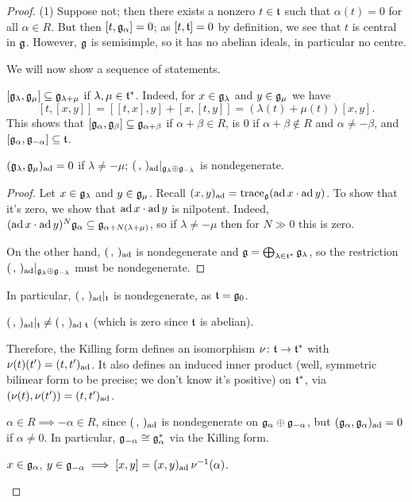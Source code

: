 \begin{proof}\leavevmode
(1) Suppose not; then there exists a nonzero $t \in \mathfrak{t}$ such that
$\alpha(t) = 0$ for all $\alpha \in R$. But then $[t, \mathfrak{g}_\alpha] = 0$; as
$[t, \mathfrak{t}] = 0$ by definition, we see that $t$ is central in $\mathfrak{g}$. However, $\mathfrak{g}$
is semisimple, so it has no abelian ideals, in particular no centre.

We will now show a sequence of statements.
\begin{alist}
  \item $[\mathfrak{g}_\lambda, \mathfrak{g}_\mu] \subseteq \mathfrak{g}_{\lambda+\mu}$ if
    $\lambda, \mu \in \mathfrak{t}^*$. Indeed, for $x \in \mathfrak{g}_\lambda$ and
    $y \in \mathfrak{g}_\mu$ we have
    \[
      [t, [x, y]] = [[t, x], y] + [x, [t, y]] = (\lambda(t) + \mu(t))[x, y].
    \]
    This shows that $[\mathfrak{g}_\alpha, \mathfrak{g}_\beta] \subseteq \mathfrak{g}_{\alpha+\beta}$ if
    $\alpha + \beta \in R$, is $0$ if $\alpha + \beta \notin R$ and
    $\alpha \neq -\beta$, and $[\mathfrak{g}_\alpha, \mathfrak{g}_{-\alpha}] \subseteq \mathfrak{t}$.
  \item $(\mathfrak{g}_\lambda, \mathfrak{g}_\mu)_{\operatorname{ad}} = 0$ if $\lambda \neq -\mu$;
    $(\,,\,)_{\operatorname{ad}}|_{\mathfrak{g}_\lambda \oplus \mathfrak{g}_{-\lambda}}$ is nondegenerate.

    \begin{proof}
    Let $x \in \mathfrak{g}_\lambda$ and $y \in \mathfrak{g}_\mu$. Recall
    $(x, y)_{\operatorname{ad}} = \operatorname{trace}_{\mathfrak{g}}(\operatorname{ad} x \cdot \operatorname{ad} y)$. To show that it's zero, we
    show that $\operatorname{ad} x \cdot \operatorname{ad} y$ is nilpotent. Indeed,
    $(\operatorname{ad} x \cdot \operatorname{ad} y)^N\mathfrak{g}_\alpha \subseteq \mathfrak{g}_{\alpha + N(\lambda+\mu)}$,
    so if $\lambda \neq -\mu$ then for $N \gg 0$ this is zero.

    On the other hand, $(\,,\,)_{\operatorname{ad}}$ is nondegenerate and
    $\mathfrak{g} = \bigoplus_{\lambda \in \mathfrak{t}^*} \mathfrak{g}_\lambda$, so the restriction
    $(\,,\,)_{\operatorname{ad}}|_{\mathfrak{g}_\lambda \oplus \mathfrak{g}_{-\lambda}}$ must be nondegenerate.
    \end{proof}
  \item In particular, $(\,,\,)_{\operatorname{ad}}|_{\mathfrak{t}}$ is nondegenerate, as
    $\mathfrak{t} = \mathfrak{g}_0$.

    \begin{remark}
    $(\,,\,)_{\operatorname{ad}}|_{\mathfrak{t}} \neq (\,,\,)_{\operatorname{ad}\,\mathfrak{t}}$ (which is zero since $\mathfrak{t}$ is
    abelian).
    \end{remark}

    Therefore, the Killing form defines an isomorphism
    $\nu\colon \mathfrak{t} \to \mathfrak{t}^*$ with $\nu(t)(t') = (t, t')_{\operatorname{ad}}$. It also
    defines an induced inner product (well, symmetric bilinear form to be
    precise; we don't know it's positive) on $\mathfrak{t}^*$, via
    $(\nu(t), \nu(t')) = (t, t')_{\operatorname{ad}}$.
  \item $\alpha \in R \implies -\alpha \in R$, since $(\,,\,)_{\operatorname{ad}}$ is
    nondegenerate on $\mathfrak{g}_\alpha \oplus \mathfrak{g}_{-\alpha}$, but
    $(\mathfrak{g}_\alpha, \mathfrak{g}_\alpha)_{\operatorname{ad}} = 0$ if $\alpha \neq 0$. In particular,
    $\mathfrak{g}_{-\alpha} \cong \mathfrak{g}_\alpha^*$ via the Killing form.
  \item $x \in \mathfrak{g}_\alpha$, $y \in \mathfrak{g}_{-\alpha} \implies
    [x, y] = (x, y)_{\operatorname{ad}}\, \nu^{-1}(\alpha)$.


\end{alist}
\end{proof}
